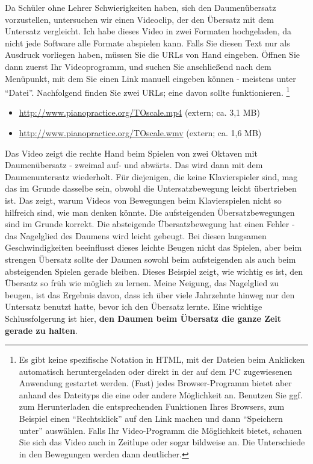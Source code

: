Da Schüler ohne Lehrer Schwierigkeiten haben, sich den Daumenübersatz vorzustellen, untersuchen wir einen Videoclip, der den Übersatz mit dem Untersatz vergleicht.
Ich habe dieses Video in zwei Formaten hochgeladen, da nicht jede Software alle Formate abspielen kann.
Falls Sie diesen Text nur als Ausdruck vorliegen haben, müssen Sie die URLs von Hand eingeben.
Öffnen Sie dann zuerst Ihr Videoprogramm, und suchen Sie anschließend nach dem Menüpunkt, mit dem Sie einen Link manuell eingeben können - meistens unter \enquote{Datei}.
Nachfolgend finden Sie zwei URLs; eine davon sollte funktionieren.
\footnote{Es gibt keine spezifische Notation in HTML, mit der Dateien beim Anklicken automatisch heruntergeladen oder direkt in der auf dem PC zugewiesenen Anwendung gestartet werden.
(Fast) jedes Browser-Programm bietet aber anhand des Dateityps die eine oder andere Möglichkeit an.
Benutzen Sie ggf. zum Herunterladen die entsprechenden Funktionen Ihres Browsers, zum Beispiel einen \enquote{Rechtsklick} auf den Link machen und dann \enquote{Speichern unter} auswählen.
Falls Ihr Video-Programm die Möglichkeit bietet, schauen Sie sich das Video auch in Zeitlupe oder sogar bildweise an.  Die Unterschiede in den Bewegungen werden dann deutlicher.}

\begin{itemize} 
 \item \hyperref[http://www.pianopractice.org/TOscale.mp4]{http://www.pianopractice.org/TOscale.mp4} (extern; ca. 3,1 MB)
 \item \hyperref[http://www.pianopractice.org/TOscale.wmv]{http://www.pianopractice.org/TOscale.wmv} (extern; ca. 1,6 MB)
\end{itemize}

Das Video zeigt die rechte Hand beim Spielen von zwei Oktaven mit Daumenübersatz - zweimal auf- und abwärts.
Das wird dann mit dem Daumenuntersatz wiederholt.
Für diejenigen, die keine Klavierspieler sind, mag das im Grunde dasselbe sein, obwohl die Untersatzbewegung leicht übertrieben ist.
Das zeigt, warum Videos von Bewegungen beim Klavierspielen nicht so hilfreich sind, wie man denken könnte.
Die aufsteigenden Übersatzbewegungen sind im Grunde korrekt.
Die absteigende Übersatzbewegung hat einen Fehler - das Nagelglied des Daumens wird leicht gebeugt.
Bei diesen langsamen Geschwindigkeiten beeinflusst dieses leichte Beugen nicht das Spielen, aber beim strengen Übersatz sollte der Daumen sowohl beim aufsteigenden als auch beim absteigenden Spielen gerade bleiben.
Dieses Beispiel zeigt, wie wichtig es ist, den Übersatz so früh wie möglich zu lernen.
Meine Neigung, das Nagelglied zu beugen, ist das Ergebnis davon, dass ich über viele Jahrzehnte hinweg nur den Untersatz benutzt hatte, bevor ich den Übersatz lernte.
Eine wichtige Schlussfolgerung ist hier, \textbf{den Daumen beim Übersatz die ganze Zeit gerade zu halten}.



